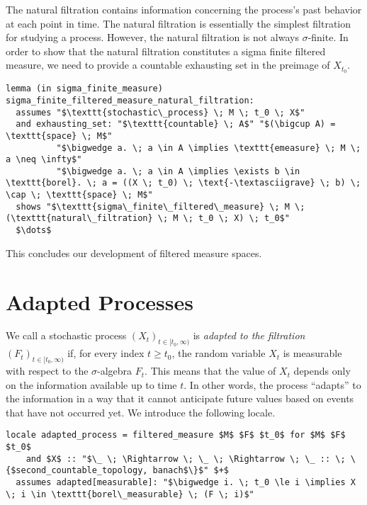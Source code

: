 The natural filtration contains information concerning the process's past behavior at each point in time. The natural filtration is essentially the simplest filtration for studying a process. However, the natural filtration is not always $\sigma$-finite. In order to show that the natural filtration constitutes a sigma finite filtered measure, we need to provide a countable exhausting set in the preimage of $X_{t_0}$.

\begin{isalemma}
{\small
\begin{lstlisting}[style=isabelle]
lemma (in sigma_finite_measure) sigma_finite_filtered_measure_natural_filtration:
  assumes "$\texttt{stochastic\_process} \; M \; t_0 \; X$"
  and exhausting_set: "$\texttt{countable} \; A$" "$(\bigcup A) = \texttt{space} \; M$" 
		  "$\bigwedge a. \; a \in A \implies \texttt{emeasure} \; M \; a \neq \infty$" 
		  "$\bigwedge a. \; a \in A \implies \exists b \in \texttt{borel}. \; a = ((X \; t_0) \; \text{-\textasciigrave} \; b) \; \cap \; \texttt{space} \; M$"
  shows "$\texttt{sigma\_finite\_filtered\_measure} \; M \; (\texttt{natural\_filtration} \; M \; t_0 \; X) \; t_0$"
  $\dots$
\end{lstlisting}
}
\end{isalemma}

This concludes our development of filtered measure spaces.

\section{Adapted Processes}

We call a stochastic process $(X_t)_{t \in [t_0, \infty)}$ is \textit{adapted to the filtration $(F_t)_{t \in [t_0, \infty)}$} if, for every index $t \ge t_0$, the random variable $X_t$ is measurable with respect to the $\sigma$-algebra $F_t$. This means that the value of $X_t$ depends only on the information available up to time $t$. In other words, the process ``adapts'' to the information in a way that it cannot anticipate future values based on events that have not occurred yet. We introduce the following locale.

\begin{isalemma}
{\small
\begin{lstlisting}[style=isabelle]
locale adapted_process = filtered_measure $M$ $F$ $t_0$ for $M$ $F$ $t_0$ 
	and $X$ :: "$\_ \; \Rightarrow \; \_ \; \Rightarrow \; \_ :: \; \{$second_countable_topology, banach$\}$" $+$
  assumes adapted[measurable]: "$\bigwedge i. \; t_0 \le i \implies X \; i \in \texttt{borel\_measurable} \; (F \; i)$"
\end{lstlisting}
}
\end{isalemma}

